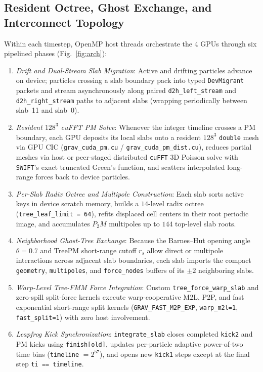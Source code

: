 \documentclass[aps,prd,reprint,superscriptaddress,nofootinbib,amsmath,amssymb,floatfix,longbibliography]{revtex4-2}
\begin{document}
\subsection{Resident Octree, Ghost Exchange, and Interconnect Topology}

Within each timestep, OpenMP host threads orchestrate the 4 GPUs through six pipelined phases (Fig.~\ref{fig:arch}):
\begin{enumerate}
  \item \textit{Drift and Dual-Stream Slab Migration}: Active and drifting particles advance on device; particles crossing a slab boundary pack into typed \texttt{DevMigrant} packets and stream asynchronously along paired \texttt{d2h\_left\_stream} and \texttt{d2h\_right\_stream} paths to adjacent slabs (wrapping periodically between slab~11 and slab~0).
  \item \textit{Resident $128^3$ cuFFT PM Solve}: Whenever the integer timeline crosses a PM boundary, each GPU deposits its local slabs onto a resident $128^3$ \texttt{double} mesh via GPU CIC (\texttt{grav\_cuda\_pm.cu} / \texttt{grav\_cuda\_pm\_dist.cu}), reduces partial meshes via host or peer-staged distributed \texttt{cuFFT} 3D Poisson solve with \texttt{SWIFT}'s exact truncated Green's function, and scatters interpolated long-range forces back to device particles.
  \item \textit{Per-Slab Radix Octree and Multipole Construction}: Each slab sorts active keys in device scratch memory, builds a $14$-level radix octree (\texttt{tree\_leaf\_limit = 64}), refits displaced cell centers in their root periodic image, and accumulates $P_2M$ multipoles up to $144$ top-level slab roots.
  \item \textit{Neighborhood Ghost-Tree Exchange}: Because the Barnes--Hut opening angle $\theta = 0.7$ and TreePM short-range cutoff $r_s$ allow direct or multipole interactions across adjacent slab boundaries, each slab imports the compact \texttt{geometry}, \texttt{multipoles}, and \texttt{force\_nodes} buffers of its $\pm 2$ neighboring slabs.
  \item \textit{Warp-Level Tree-FMM Force Integration}: Custom \texttt{tree\_force\_warp\_slab} and zero-spill split-force kernels execute warp-cooperative M2L, P2P, and fast exponential short-range split kernels (\texttt{GRAV\_FAST\_M2P\_EXP}, \texttt{warp\_m2l=1}, \texttt{fast\_split=1}) with zero host involvement.
  \item \textit{Leapfrog Kick Synchronization}: \texttt{integrate\_slab} closes completed \texttt{kick2} and PM kicks using \texttt{finish[old]}, updates per-particle adaptive power-of-two time bins (\texttt{timeline} $= 2^{57}$), and opens new \texttt{kick1} steps except at the final step \texttt{ti == timeline}.
\end{enumerate}
\end{document}
